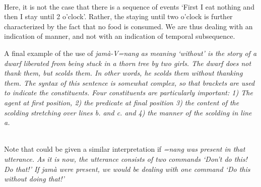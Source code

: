  \\
Here, it is not the case that there is a sequence of events `First I eat nothing and then I stay until 2 o'clock'. Rather, the staying until two o'clock is further characterized by the fact that no food is consumed. We are thus dealing with an indication of manner, and not with an indication of temporal subsequence.

A final example of the use of \em jamà-V=nang \em as meaning `without' is the story of a dwarf liberated from being stuck in a thorn tree by two girls. The dwarf does not thank them, but scolds them. In other words, he scolds them without thanking them. The syntax of this sentence is somewhat complex, so that brackets are used to indicate the constituents. Four constituents are particularly important: 1) The agent  at first position, 2) the predicate  at final position 3) the content of the scolding stretching over lines b. and c. and 4) the manner of the scolding in line a.


\\ 




Note that  could be given a similar interpretation if   \em =nang \em was present in that utterance. As it is now, the utterance consists of two commands `Don't do this! Do that!' If \em jamà \em were present, we would be dealing with one command  `Do this without doing that!'



